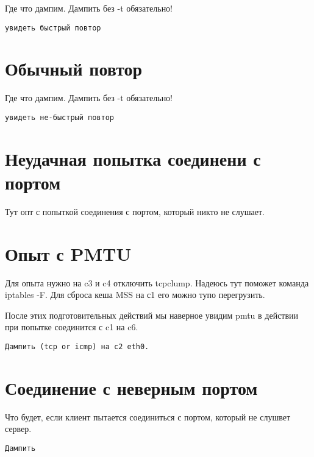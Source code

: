 \documentclass[a4paper,12pt]{article}
\begin{document}
Где что дампим.  Дампить без -t обязательно!

\begin{Verbatim}
увидеть быстрый повтор
\end{Verbatim}

\section{Обычный повтор}

Где что дампим. Дампить без -t обязательно!

\begin{Verbatim}
увидеть не-быстрый повтор
\end{Verbatim}

\section{Неудачная попытка соединени с портом}

Тут опт с попыткой соединения с портом, который никто не слушает.

\section{Опыт с PMTU}

Для опыта нужно на c3 и c4 отключить tcpclump.
Надеюсь тут поможет команда iptables -F.
Для сброса кеша MSS на с1 его можно тупо перегрузить.

После этих подготовительных действий мы наверное увидим pmtu в действии при попытке соединится с c1 на c6.

\begin{Verbatim}
Дампить (tcp or icmp) на c2 eth0.
\end{Verbatim}

\section{Соединение с неверным портом}

Что будет, если клиент пытается соединиться с портом, который не слушвет сервер.

\begin{Verbatim}
Дампить
\end{Verbatim}
\end{document}
